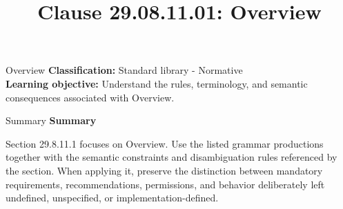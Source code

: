 \documentclass[10pt,letterpaper]{article}
\title{Clause 29.08.11.01: Overview}
\author{}
\date{}
\begin{document}
\maketitle
\begin{CornellOverviewBox}{Overview}
\textbf{Classification:} Standard library - Normative\\[2pt]
\textbf{Learning objective:} Understand the rules, terminology, and semantic consequences associated with Overview.
\end{CornellOverviewBox}\begin{CornellSummaryBox}{Summary}
{\sffamily\bfseries\color{Accent} Summary}\par\vspace{3pt}Section 29.8.11.1 focuses on Overview. Use the listed grammar productions together with the semantic constraints and disambiguation rules referenced by the section. When applying it, preserve the distinction between mandatory requirements, recommendations, permissions, and behavior deliberately left undefined, unspecified, or implementation-defined.
\end{CornellSummaryBox}
\end{document}
